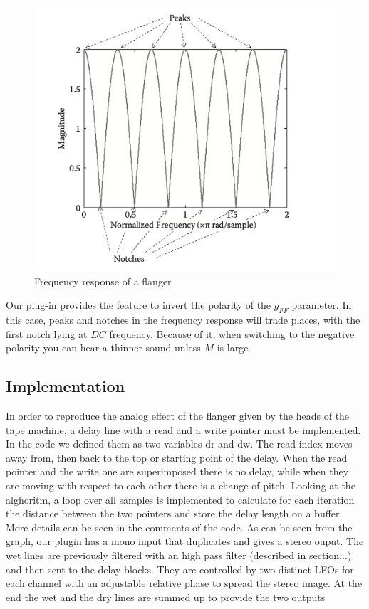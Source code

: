 \begin{figure}
	\centering
	\includegraphics[width=0.5\linewidth]{assets/comb.png}
	\caption{Frequency response of a flanger}
	\label{fig:comb}
\end{figure}

Our plug-in provides the feature to invert the polarity of the $g_{FF}$ parameter. In this case, peaks and notches in the frequency response will trade places, with the first notch lying at $DC$ frequency. Because of it, when switching to the negative polarity you can hear a thinner sound unless $M$ is large.

\subsection{Implementation}\label{sec:implementation}

In order to reproduce the analog effect of the flanger given by the heads of the tape machine, a delay line with a read and a write pointer must be implemented. In the code we defined them as two variables dr and dw. The read index moves away from, then back to the top or starting point of the delay. When the read pointer and the write one are superimposed there is no delay, while when they are moving with respect to each other there is a change of pitch. Looking at the alghoritm, a loop over all samples is implemented to calculate for each iteration the distance between the two pointers and store the delay length on a buffer. More details can be seen in the comments of the code.
As can be seen from the graph, our plugin has a mono input that duplicates and gives a stereo ouput. The wet lines are previously filtered with an high pass filter (described in section...) and then sent to the delay blocks. They are controlled by two distinct LFOs for each channel with an adjustable relative phase to spread the stereo image. At the end the wet and the dry lines are summed up to provide the two outputs $$ 

